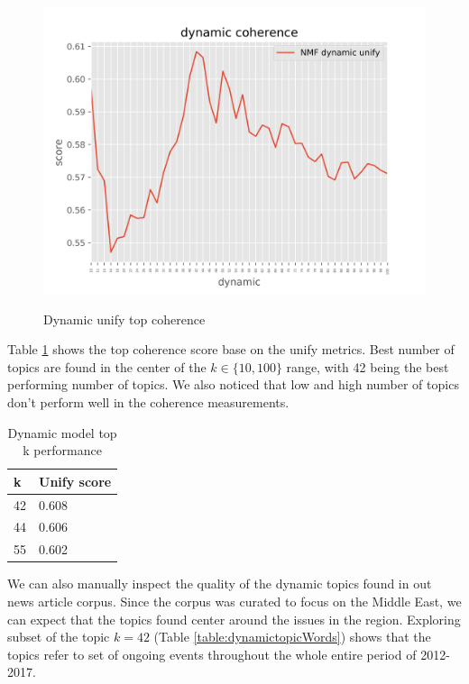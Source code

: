\begin{figure}[H]
\centering
\caption{Dynamic unify top coherence}
\includegraphics[scale=.7]{img/dynamic_coherence_plot.png}
\label{fig:topk_coherence_tc}
\end{figure}

Table \ref{table:dynamictopk} shows the top coherence score base on the unify metrics. Best number of topics are found in the center of the $k \in \{10, 100\}$ range, with 42 being the best performing number of topics. We also noticed that low and high number of topics don't perform well in the coherence measurements. 

\begin{table}[H]
\centering
\caption{Dynamic model top k performance}
\label{table:dynamictopk}
\begin{tabular}{|l|l|}
\hline
k  & Unify score \\ \hline
42 & 0.608       \\ \hline
44 & 0.606       \\ \hline
55 & 0.602       \\ \hline
\end{tabular}
\end{table}


We can also manually inspect the quality of the dynamic topics found in out news article corpus. Since the corpus was curated to focus on the Middle East, we can expect that the topics found center around the issues in the region. Exploring subset of the topic $k = 42$ (Table \ref{table:dynamictopicWords}) shows that the topics refer to set of ongoing events throughout the whole entire period of 2012-2017. 


